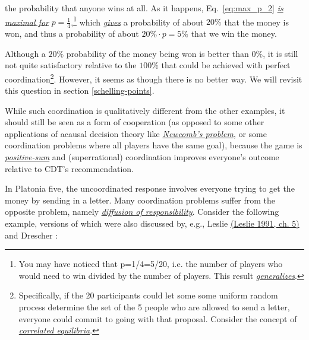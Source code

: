 the probability that anyone wins at all. As it happens, Eq.~\eqref{eq:max_p_2}
\href{http://www.wolframalpha.com/input/?i=maximize+p\%5E5+*+(1-p)\%5E15}{\emph{is
maximal for}} \(p = \frac{1}{4}\),\footnote{You may have noticed that
  p=1/4=5/20, i.e. the number of players who would need to win divided
  by the number of players. This result
  \href{http://www.wolframalpha.com/input/?i=d\%2Fdp+p\%5En+(1-p)\%5Em}{\emph{generalizes}}.}
which
\href{http://www.wolframalpha.com/input/?i=(20+choose+5)+*+(1\%2F4)\%5E5+*+(3\%2F4)\%5E15}{\emph{gives}}
a probability of about \(20\%\) that the money is won, and thus a
probability of about \(20\% \cdot p = 5\%\) that we win the money.

Although a \(20\%\) probability of the money being won is better than
\(0\%\), it is still not quite satisfactory relative to the \(100\%\)
that could be achieved with perfect coordination\footnote{Specifically,
  if the 20 participants could let some some uniform random process
  determine the set of the 5 people who are allowed to send a letter,
  everyone could commit to going with that proposal. Consider the
  concept of
  \href{https://en.wikipedia.org/wiki/Correlated_equilibrium}{\emph{correlated
  equilibria}}.}. However, it seems as though there is no better way. We
will revisit this question in section
\ref{schelling-points}.

While such coordination is qualitatively different from the other
examples, it should still be seen as a form of cooperation (as opposed
to some other applications of acausal decision theory like
\href{http://lesswrong.com/lw/nc/newcombs_problem_and_regret_of_rationality/}{\emph{Newcomb's
problem}}, or some coordination problems where all players have the same
goal), because the game is
\href{https://www.edge.org/response-detail/10135}{\emph{positive-sum}}
and (superrational) coordination improves everyone's outcome relative to
CDT's recommendation.

In Platonia five, the uncoordinated response involves everyone trying to
get the money by sending in a letter. Many coordination problems suffer
from the opposite problem, namely
\href{https://en.wikipedia.org/wiki/Diffusion_of_responsibility}{\emph{diffusion
of responsibility}}. Consider the following example, versions of which
were also discussed by, e.g., Leslie
\href{https://sl4librarian.files.wordpress.com/2016/12/two-bird-deaths-one-throw-leslie.pdf}{(Leslie
1991, ch. 5)} and Drescher \parencite{Drescher2006-ky}:


